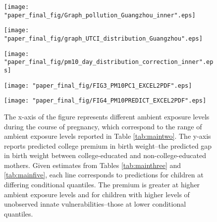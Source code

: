 \newcommand{\FIGNOTESMAINFIGFOUR}{\small\EMPHNOTES The x-axis of the figure represents different ambient \PARPMTEN exposure levels during the course of pregnancy, which correspond to the range of ambient \PARPMTEN exposure levels reported in Table \ref{tab:maintwo}. The y-axis reports predicted college premium in birth weight--the predicted gap in birth weight between college-educated and non-college-educated mothers. Given estimates from Tables \ref{tab:mainthree} and \ref{tab:mainfive}, each line corresponds to predictions for children at differing conditional quantiles. The premium is greater at higher ambient exposure levels and for children with higher levels of unobserved innate vulnerabilities--those at lower conditional quantiles.}



\pagebreak 
\begin{figure}[H]
	\centering
	\caption{\TITLEFIGONE}
	\texttt{[image: "paper\_final\_fig/Graph\_pollution\_Guangzhou\_inner".eps]}
	\captionsetup{width=1.0\textwidth}\caption*{\FIGNOTESMAINFIGONE}
\end{figure}
\pagebreak 
\begin{figure}[H]
	\centering
	\caption{\TITLEFIGONETEMP}
	\texttt{[image: "paper\_final\_fig/graph\_UTCI\_distribution\_Guangzhou".eps]}
	\captionsetup{width=0.75\textwidth}\caption*{\FIGNOTESMAINFIGONETEMP}
\end{figure}
\pagebreak 
\begin{figure}[H]
	\centering
	\caption{\TITLEFIGTWO}
	\texttt{[image: "paper\_final\_fig/pm10\_day\_distribution\_correction\_inner".eps]}
	\captionsetup{width=1.0\textwidth}\caption*{\FIGNOTESMAINFIGTWO}
\end{figure}
\pagebreak 
\begin{figure}[H]
	\centering
	\captionsetup{width=1.00\textwidth}\caption{\TITLEFIGTHREE}
	\texttt{[image: "paper\_final\_fig/FIG3\_PM10PC1\_EXCEL2PDF".eps]}
	\captionsetup{width=1.00\textwidth}\caption*{\FIGNOTESMAINFIGTHREE}
\end{figure}
\pagebreak 
\begin{figure}[H]
	\centering
	\caption{\TITLEFIGFOUR}
	\texttt{[image: "paper\_final\_fig/FIG4\_PM10PREDICT\_EXCEL2PDF".eps]}
	\captionsetup{width=1.0\textwidth}\caption*{\FIGNOTESMAINFIGFOUR}
\end{figure}
\clearpage


\pagebreak 

\pagebreak 

\pagebreak 

\pagebreak 

\pagebreak 

\pagebreak
\clearpage